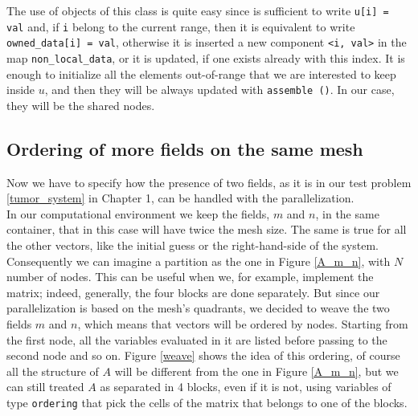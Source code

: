 The use of objects of this class is quite easy since is sufficient to write \texttt{u[i] = val} and, if  \texttt{i} belong to the current range, then it is equivalent to write \texttt{owned\_data[i] = val}, otherwise it is inserted a new component \texttt{<i, val>} in the map \texttt{non\_local\_data}, or it is updated, if one exists already with this index. It is enough to initialize all the elements out-of-range that we are interested to keep inside $ u $, and then they will be always updated with \texttt{assemble ()}. In our case, they will be the shared nodes.\\
\subsection{Ordering of more fields on the same mesh}
Now we have to specify how the presence of two fields, as it is in our test problem \eqref{tumor_system} in Chapter 1, can be handled with the parallelization. \\
In our computational environment we keep the fields, $ m $ and $ n $, in the same container, that in this case will have twice the mesh size. The same is true for all the other vectors, like the initial guess or the right-hand-side of the system.\\
Consequently we can imagine a partition as the one in Figure \ref{A_m_n}, with $ N $ number of nodes. This can be useful when we, for example, implement the matrix; indeed, generally, the four blocks are done separately. But since our parallelization is based on the mesh's quadrants, we decided to weave the two fields $ m $ and $ n $, which means that vectors will be ordered by nodes. Starting from the first node, all the variables evaluated in it are listed before passing to the second node and so on. Figure \ref{weave} shows the idea of this ordering, of course all the structure of $ A $ will be different from the one in Figure \ref{A_m_n}, but we can still treated $ A $ as separated in 4 blocks, even if it is not, using variables of type \texttt{ordering} that pick the cells of the matrix that belongs to one of the blocks.
